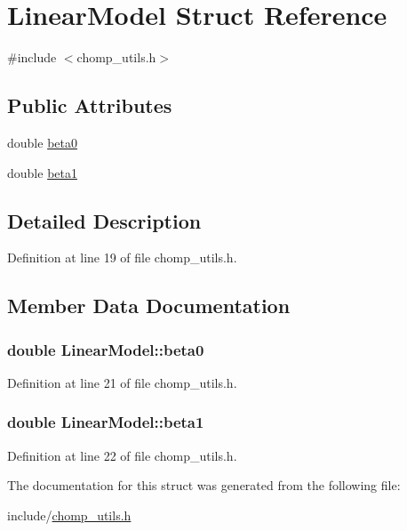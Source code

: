\hypertarget{struct_linear_model}{}\section{Linear\+Model Struct Reference}
\label{struct_linear_model}


{\ttfamily \#include $<$chomp\+\_\+utils.\+h$>$}

\subsection*{Public Attributes}
\begin{DoxyCompactItemize}
\item 
double \hyperlink{struct_linear_model_ae49f43f205d39ee14841dae7f83abab4}{beta0}
\item 
double \hyperlink{struct_linear_model_af8db55999999e4adb71ddc1883297e4c}{beta1}
\end{DoxyCompactItemize}


\subsection{Detailed Description}


Definition at line 19 of file chomp\+\_\+utils.\+h.



\subsection{Member Data Documentation}
\subsubsection[{\texorpdfstring{beta0}{beta0}}]{\setlength{\rightskip}{0pt plus 5cm}double Linear\+Model\+::beta0}\hypertarget{struct_linear_model_ae49f43f205d39ee14841dae7f83abab4}{}\label{struct_linear_model_ae49f43f205d39ee14841dae7f83abab4}


Definition at line 21 of file chomp\+\_\+utils.\+h.

\subsubsection[{\texorpdfstring{beta1}{beta1}}]{\setlength{\rightskip}{0pt plus 5cm}double Linear\+Model\+::beta1}\hypertarget{struct_linear_model_af8db55999999e4adb71ddc1883297e4c}{}\label{struct_linear_model_af8db55999999e4adb71ddc1883297e4c}


Definition at line 22 of file chomp\+\_\+utils.\+h.



The documentation for this struct was generated from the following file\+:\begin{DoxyCompactItemize}
\item 
include/\hyperlink{chomp__utils_8h}{chomp\+\_\+utils.\+h}\end{DoxyCompactItemize}
